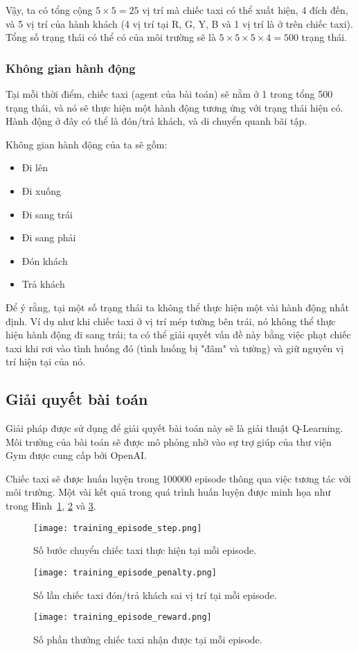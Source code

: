 Vậy, ta có tổng cộng $5 \times 5=25$ vị trí mà chiếc taxi có thể xuất hiện,
4 đích đến, và 5 vị trí của hành khách
(4 vị trí tại R, G, Y, B và 1 vị trí là ở trên chiếc taxi).
Tổng số trạng thái có thể có của môi trường sẽ là
$5 \times 5 \times 5 \times 4=500$ trạng thái.

\subsubsection{Không gian hành động}
Tại mỗi thời điểm, chiếc taxi (agent của bài toán)
sẽ nằm ở 1 trong tổng 500 trạng thái,
và nó sẽ thực hiện một hành động tương ứng với trạng thái hiện có.
Hành động ở đây có thể là đón/trả khách, và di chuyển quanh bãi tập.

Không gian hành động của ta sẽ gồm:
\begin{itemize}
    \item Đi lên
    \item Đi xuống
    \item Đi sang trái
    \item Đi sang phải
    \item Đón khách
    \item Trả khách
\end{itemize}

Để ý rằng, tại một số trạng thái ta không thể thực hiện
một vài hành động nhất định.
Ví dụ như khi chiếc taxi ở vị trí mép tường bên trái,
nó không thể thực hiện hành động đi sang trái;
ta có thể giải quyết vấn đề này bằng việc phạt chiếc taxi
khi rơi vào tình huống đó (tình huống bị "đâm" và tường)
và giữ nguyên vị trí hiện tại của nó.

\subsection{Giải quyết bài toán}
Giải pháp được sử dụng để giải quyết bài toán này
sẽ là giải thuật Q-Learning.
Môi trường của bài toán sẽ được mô phỏng nhờ vào sự trợ giúp
của thư viện Gym được cung cấp bởi OpenAI.

Chiếc taxi sẽ được huấn luyện trong 100000 episode
thông qua việc tương tác với môi trường.
Một vài kết quả trong quá trình huấn luyện được minh họa như trong
Hình~\ref{fig:training_episode_step},
\ref{fig:training_episode_penalty} và \ref{fig:training_episode_reward}.

\begin{figure}[H]
    \centering
    \texttt{[image: training\_episode\_step.png]}
    \caption{Số bước chuyển chiếc taxi thực hiện tại mỗi episode.}
    \label{fig:training_episode_step}
\end{figure}
\begin{figure}[H]
    \centering
    \texttt{[image: training\_episode\_penalty.png]}
    \caption{Số lần chiếc taxi đón/trả khách sai vị trí tại mỗi episode.}
    \label{fig:training_episode_penalty}
\end{figure}
\begin{figure}[H]
    \centering
    \texttt{[image: training\_episode\_reward.png]}
    \caption{Số phần thưởng chiếc taxi nhận được tại mỗi episode.}
    \label{fig:training_episode_reward}
\end{figure}

